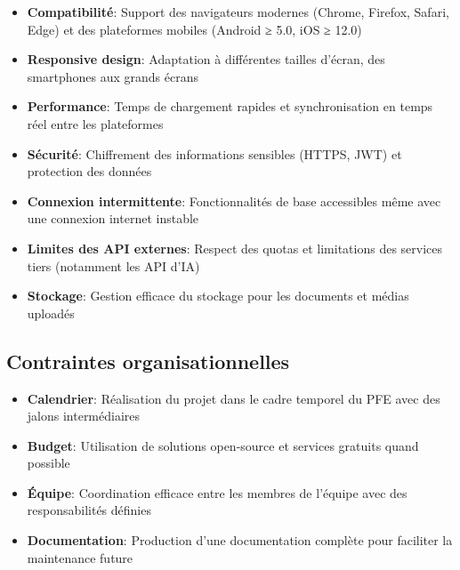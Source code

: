 \begin{itemize}
  \item \textbf{Compatibilité}: Support des navigateurs modernes (Chrome, Firefox, Safari, Edge) et des plateformes mobiles (Android ≥ 5.0, iOS ≥ 12.0)
  
  \item \textbf{Responsive design}: Adaptation à différentes tailles d'écran, des smartphones aux grands écrans
  
  \item \textbf{Performance}: Temps de chargement rapides et synchronisation en temps réel entre les plateformes
  
  \item \textbf{Sécurité}: Chiffrement des informations sensibles (HTTPS, JWT) et protection des données
  
  \item \textbf{Connexion intermittente}: Fonctionnalités de base accessibles même avec une connexion internet instable
  
  \item \textbf{Limites des API externes}: Respect des quotas et limitations des services tiers (notamment les API d'IA)
  
  \item \textbf{Stockage}: Gestion efficace du stockage pour les documents et médias uploadés
\end{itemize}

\subsection{Contraintes organisationnelles}

\begin{itemize}
  \item \textbf{Calendrier}: Réalisation du projet dans le cadre temporel du PFE avec des jalons intermédiaires
  
  \item \textbf{Budget}: Utilisation de solutions open-source et services gratuits quand possible
  
  \item \textbf{Équipe}: Coordination efficace entre les membres de l'équipe avec des responsabilités définies
  
  \item \textbf{Documentation}: Production d'une documentation complète pour faciliter la maintenance future
\end{itemize}


